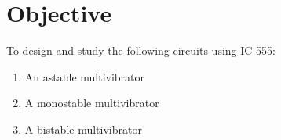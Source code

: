 \section{Objective}
To design and study the following circuits using IC 555:
\begin{enumerate}
    \item An astable multivibrator
    \item A monostable multivibrator
    \item A bistable multivibrator
\end{enumerate}